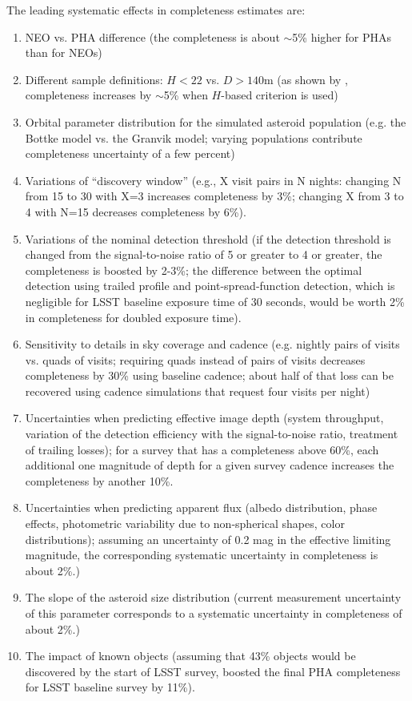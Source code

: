 \documentclass[12pt,preprint]{aastex}
\begin{document}
The leading systematic effects in completeness estimates are: 
\begin{enumerate}
\item NEO vs. PHA difference (the completeness is about $\sim$5\% higher for PHAs than for NEOs) 
\item Different sample definitions: $H<22$ vs. $D>140$m (as shown by \citep{GMS2016}, completeness
           increases by $\sim$5\% when $H$-based criterion is used) 
\item Orbital parameter distribution for the simulated asteroid population (e.g. the Bottke model
             vs. the Granvik model; varying populations contribute completeness uncertainty of a few percent) 
\item Variations of ``discovery window'' (e.g., X visit pairs in N nights: changing N from 15 to 30 with X=3 increases
          completeness by 3\%; changing X from 3 to 4 with N=15 decreases completeness by 6\%). 
\item Variations of the nominal detection threshold (if the detection threshold is changed from the 
          signal-to-noise ratio of 5 or greater to 4 or greater, the completeness is boosted by 2-3\%; 
          the difference between the optimal detection using trailed profile and point-spread-function 
          detection, which is negligible for LSST baseline exposure time of 30 seconds, would be worth 2\%
          in completeness for doubled exposure time). 
\item Sensitivity to details in sky coverage and cadence (e.g. nightly pairs of visits vs. quads of visits;
          requiring quads instead of pairs of visits decreases completeness by 30\% using baseline cadence; 
          about half of that loss can be recovered using cadence simulations that request four visits per night) 
\item Uncertainties when predicting effective image depth (system throughput, variation of the detection efficiency
          with the signal-to-noise ratio, treatment of trailing losses); for a survey that has a completeness above 60\%, 
          each additional one magnitude of depth for a given survey cadence increases the completeness by another 10\%.
\item Uncertainties when predicting apparent flux (albedo distribution, phase effects, photometric variability 
          due to non-spherical shapes, color distributions); assuming an uncertainty of 0.2 mag in the effective 
          limiting magnitude, the corresponding  systematic uncertainty in completeness is about 2\%.)
\item The slope of the asteroid size distribution (current measurement uncertainty of this parameter 
          corresponds to a systematic uncertainty in completeness of about 2\%.)
\item The impact of known objects (assuming that 43\% objects would be discovered by the start of
          LSST survey, \citep{GMS2016} boosted the final PHA completeness for LSST baseline survey by 11\%). 
\end{enumerate} 
\end{document}
